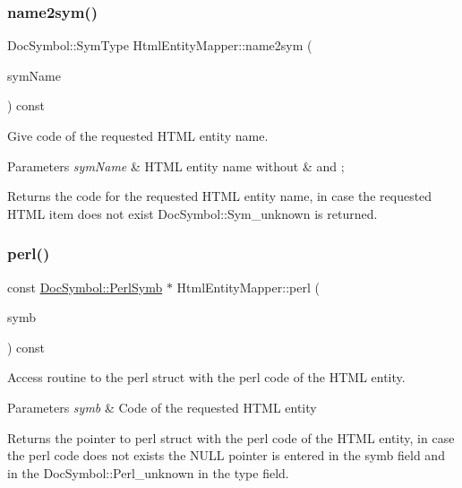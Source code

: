 \subsubsection{\texorpdfstring{name2sym()}{name2sym()}}
{\footnotesize\ttfamily Doc\+Symbol\+::\+Sym\+Type Html\+Entity\+Mapper\+::name2sym (\begin{DoxyParamCaption}\item[{const \mbox{\hyperlink{class_q_c_string}{Q\+C\+String}} \&}]{sym\+Name }\end{DoxyParamCaption}) const}



Give code of the requested H\+T\+ML entity name. 


\begin{DoxyParams}{Parameters}
{\em sym\+Name} & H\+T\+ML entity name without {\ttfamily \&} and {\ttfamily }; \\
\hline
\end{DoxyParams}
\begin{DoxyReturn}{Returns}
the code for the requested H\+T\+ML entity name, in case the requested H\+T\+ML item does not exist {\ttfamily Doc\+Symbol\+::\+Sym\+\_\+unknown} is returned. 
\end{DoxyReturn}
\mbox{\label{class_html_entity_mapper_aff1f6887be8ea6433a2cb33994aba368}} 
\subsubsection{\texorpdfstring{perl()}{perl()}}
{\footnotesize\ttfamily const \mbox{\hyperlink{struct_doc_symbol_1_1_perl_symb}{Doc\+Symbol\+::\+Perl\+Symb}} $\ast$ Html\+Entity\+Mapper\+::perl (\begin{DoxyParamCaption}\item[{Doc\+Symbol\+::\+Sym\+Type}]{symb }\end{DoxyParamCaption}) const}



Access routine to the perl struct with the perl code of the H\+T\+ML entity. 


\begin{DoxyParams}{Parameters}
{\em symb} & Code of the requested H\+T\+ML entity \\
\hline
\end{DoxyParams}
\begin{DoxyReturn}{Returns}
the pointer to perl struct with the perl code of the H\+T\+ML entity, in case the perl code does not exists the N\+U\+LL pointer is entered in the {\ttfamily symb} field and in the {\ttfamily Doc\+Symbol\+::\+Perl\+\_\+unknown} in the {\ttfamily type} field. 
\end{DoxyReturn}
\mbox{\label{class_html_entity_mapper_aa1e5d81261fbbe19364c6c4f5b9947df}} 
